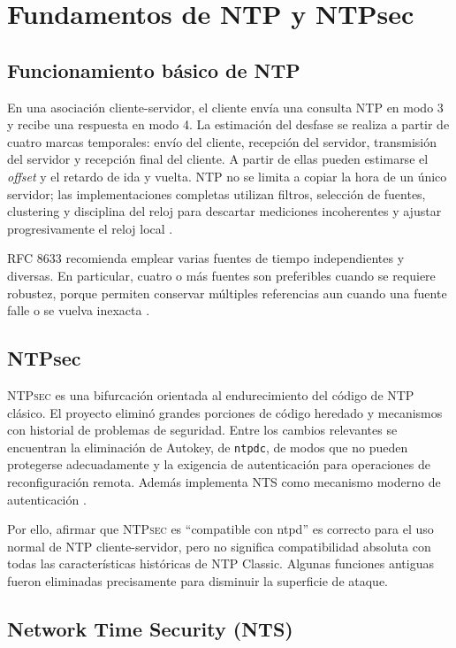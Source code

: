 \documentclass[11pt,a4paper]{article}
\newcommand{\ntpsec}{\textsc{NTPsec}}
\newcommand{\nts}{\textsc{NTS}}
\begin{document}
\section{Fundamentos de NTP y NTPsec}

\subsection{Funcionamiento básico de NTP}

En una asociación cliente-servidor, el cliente envía una consulta NTP en modo 3 y recibe una respuesta en modo 4. La estimación del desfase se realiza a partir de cuatro marcas temporales: envío del cliente, recepción del servidor, transmisión del servidor y recepción final del cliente. A partir de ellas pueden estimarse el \emph{offset} y el retardo de ida y vuelta. NTP no se limita a copiar la hora de un único servidor; las implementaciones completas utilizan filtros, selección de fuentes, clustering y disciplina del reloj para descartar mediciones incoherentes y ajustar progresivamente el reloj local \cite{rfc5905}.

RFC 8633 recomienda emplear varias fuentes de tiempo independientes y diversas. En particular, cuatro o más fuentes son preferibles cuando se requiere robustez, porque permiten conservar múltiples referencias aun cuando una fuente falle o se vuelva inexacta \cite{rfc8633}.

\subsection{NTPsec}

\ntpsec{} es una bifurcación orientada al endurecimiento del código de NTP clásico. El proyecto eliminó grandes porciones de código heredado y mecanismos con historial de problemas de seguridad. Entre los cambios relevantes se encuentran la eliminación de Autokey, de \texttt{ntpdc}, de modos que no pueden protegerse adecuadamente y la exigencia de autenticación para operaciones de reconfiguración remota. Además implementa \nts{} como mecanismo moderno de autenticación \cite{ntpsecdifferences}.

Por ello, afirmar que \ntpsec{} es ``compatible con ntpd'' es correcto para el uso normal de NTP cliente-servidor, pero no significa compatibilidad absoluta con todas las características históricas de NTP Classic. Algunas funciones antiguas fueron eliminadas precisamente para disminuir la superficie de ataque.

\subsection{Network Time Security (NTS)}
\end{document}

